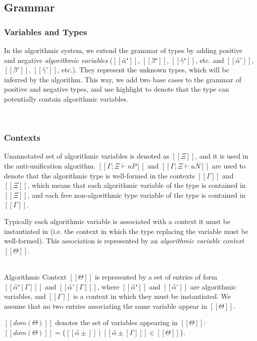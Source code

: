 \documentclass[a4,natbib=false]{article}
\begin{document}
\subsection{Grammar}

\subsubsection{Variables and Types}
In the algorithmic system, we extend the grammar of types
by adding positive and negative \emph{algorithmic variables}
($[[α̂⁺]]$, $[[β̂⁺]]$, $[[γ̂⁺]]$, etc. and $[[α̂⁻]]$, $[[β̂⁻]]$, $[[γ̂⁻]]$, etc.).
They represent the unknown types, which will be inferred by the algorithm.
This way, we add two base cases to the grammar of 
positive and negative types, and use highlight to denote that the type
can potentially contain algorithmic variables.
 
\begin{definition}
  \hfill \\
\ottgrammartabular{
  \ottuP\ottinterrule
  \ottuN\ottinterrule
}
\end{definition}

\subsubsection{Contexts}

Unannotated set of algorithmic variables is denoted as $[[Ξ]]$,
and it is used in the anti-unification algorithm.
$[[Γ ; Ξ ⊢ uP]]$ and $[[Γ ; Ξ ⊢ uN]]$ are used to denote
that the algorithmic type is well-formed in the contexts
$[[Γ]]$ and $[[Ξ]]$, which means that each algorithmic variable
of the type is contained in $[[Ξ]]$, and each free non-algorithmic type variable
of the type is contained in $[[Γ]]$.

Typically each algorithmic variable is associated with a
context it must be instantiated in 
(i.e. the context in which the type replacing the variable must be well-formed).
This association is represented by an \emph{algorithmic variable context} $[[Θ]]$.
\begin{definition}
  \hfill \\
  Algorithmic Context $[[Θ]]$ is represented by a set of 
  entries of form $[[ α̂⁺[Γ] ]]$ and $[[ α̂⁻[Γ] ]]$,
  where $[[α̂⁺]]$ and $[[α̂⁻]]$ are algorithmic variables,
  and $[[Γ]]$ is a context in which they must be instantiated.
  We assume that no two entries associating the same variable
  appear in $[[Θ]]$.

  $[[dom(Θ)]]$ denotes the set of variables appearing in $[[Θ]]$:
  $[[dom(Θ)]] = \{ [[α̂±]] \mid [[α̂±[Γ] ]] \in [[Θ]] \}$.
\end{definition}
\end{document}
